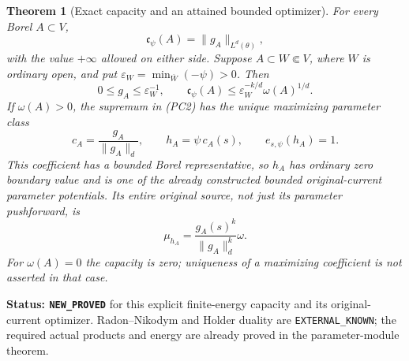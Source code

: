 \documentclass[11pt,a4paper]{article}
\numberwithin{equation}{section}
\newtheorem{theorem}{Theorem}[section]
\theoremstyle{definition}
\theoremstyle{remark}
\begin{document}
\begin{theorem}[Exact capacity and an attained bounded optimizer]
\label{thm:r12-parameter-energy-capacity-formula}
For every Borel $A\subset V$,
\[
                         \mathfrak c_\psi(A)=\|g_A\|_{L^d(\theta)},
                                                                    \tag{PC5}
\]
with the value $+\infty$ allowed on either side. Suppose
$A\subset W\Subset V$, where $W$ is ordinary open, and put
$\varepsilon_W=\min_{\overline W}(-\psi)>0$. Then
\[
              0\le g_A\le\varepsilon_W^{-1},\qquad
              \mathfrak c_\psi(A)
                    \le\varepsilon_W^{-k/d}\omega(A)^{1/d}.
                                                                    \tag{PC6}
\]
If $\omega(A)>0$, the supremum in (PC2) has the unique
maximizing parameter class
\[
                    c_A=\frac{g_A}{\|g_A\|_d},\qquad
                    h_A=\psi\,c_A(s),\qquad
                    e_{s,\psi}(h_A)=1.
                                                                    \tag{PC7}
\]
This coefficient has a bounded Borel representative, so $h_A$
has ordinary zero boundary value and is one of the already
constructed bounded original-current parameter potentials.
Its entire original source, not just its parameter pushforward,
is
\[
                        \mu_{h_A}
                             =\frac{g_A(s)^k}{\|g_A\|_d^k}\omega.
                                                                    \tag{PC8}
\]
For $\omega(A)=0$ the capacity is zero; uniqueness of a maximizing
coefficient is not asserted in that case.
\end{theorem}

\noindent\textbf{Status: \texttt{NEW\_PROVED}} for this
explicit finite-energy capacity and its original-current optimizer.
Radon--Nikodym and Holder duality are \texttt{EXTERNAL\_KNOWN};
the required actual products and energy are already proved in
the parameter-module theorem.
\end{document}
